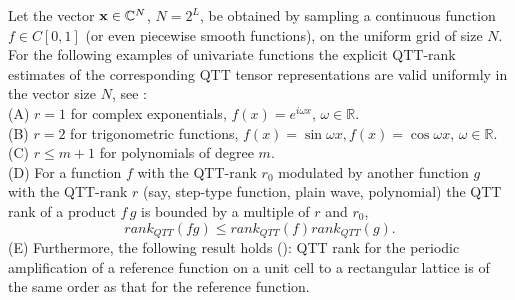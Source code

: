 \documentclass[amstex,amstext,amsfonts,epsf,12pt] {amsart}
\newcommand{\cred}{\color{red}}
\newcommand{\cn}{\color{black}}
\begin{document}
Let the vector ${\bf x}\in \mathbb{C}^N$, $N=2^L$, be obtained by sampling a continuous 
function $f\in C[0,1]$ (or even piecewise smooth functions),
 on the uniform grid of size $N$. 
 For the following examples of univariate functions the explicit QTT-rank estimates 
 of the corresponding QTT tensor representations
 are valid uniformly  in the vector size $N$, see \cite{KhQuant:09}:\\
 (A) $r=1$ for complex exponentials, $f(x)=e^{i \omega x}$, $\omega \in \mathbb{R}$.\\
 (B) $r=2$ for trigonometric functions, $f(x)=\sin {\omega x}, f(x)=\cos {\omega x}$, 
 $\omega \in \mathbb{R}$. \\
 (C) $r\leq m+1$ for polynomials of degree $m$.\\
 (D) For a function $f$ with the QTT-rank $r_0$ modulated by another function $g$ with 
the QTT-rank $r$ (say, step-type function, plain wave, polynomial) 
the QTT rank of a product $f\, g$ is bounded by a multiple of $r$ and $r_0$,
\[
 rank_{QTT}(f g)\leq rank_{QTT}(f )rank_{QTT}(g).
\]
 (E) Furthermore, the following result holds (\cite{VeBoKh:Ewald:14}): 
 QTT rank for the periodic amplification of a 
reference function on a unit cell to a rectangular lattice is of the same order as that 
for the reference function.
\end{document}
